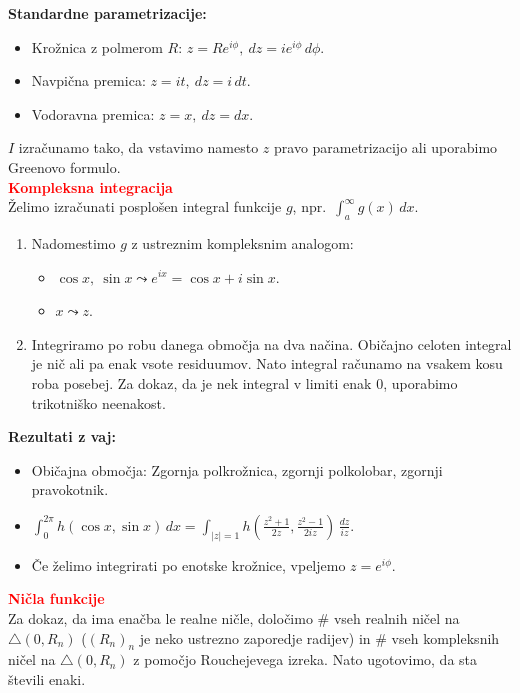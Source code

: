 \documentclass[a4paper,oneside,8pt,landscape]{extarticle}
\begin{document}
\begin{multicols*}{3}
\textbf{Standardne parametrizacije:}
\begin{itemize}
    \item Krožnica z polmerom \(R\): \(z = Re^{i \phi},\ dz = ie^{i\phi}\, d\phi\).
    \item Navpična premica: \(z = it,\ dz = i\, dt\).
    \item Vodoravna premica: \(z = x,\ dz = dx\).
\end{itemize}
\(I\) izračunamo tako, da vstavimo namesto \(z\) pravo parametrizacijo ali uporabimo Greenovo formulo.\\
\textbf{\textcolor{red}{Kompleksna integracija}}\\
Želimo izračunati posplošen integral funkcije \(g\), npr.\ \(\int_{a}^{\infty}g(x)\, dx\).
\begin{enumerate}
    \item Nadomestimo \(g\) z ustreznim kompleksnim analogom:
    \begin{itemize}
        \item \(\cos x, \ \sin x \leadsto e^{ix} = \cos x + i \sin x\).
        \item \(x \leadsto z\).
    \end{itemize}
    \item Integriramo po robu danega območja na dva načina. Običajno celoten integral je nič ali pa enak vsote residuumov. Nato integral računamo na vsakem kosu roba posebej. Za dokaz, da je nek integral v limiti enak \(0\), uporabimo trikotniško neenakost.
\end{enumerate}
\textbf{Rezultati z vaj:}
\begin{itemize}
    \item Običajna območja: Zgornja polkrožnica, zgornji polkolobar, zgornji pravokotnik.
    \item \(\int_{0}^{2\pi} h(\cos x, \sin x)\, dx = \int_{|z| = 1} h(\frac{z^2+1}{2z}, \frac{z^2-1}{2iz})\, \frac{dz}{iz}\).
    \item Če želimo integrirati po enotske krožnice, vpeljemo \(z = e^{i\phi}\).
\end{itemize}
%
%
\textbf{\textcolor{red}{Ničla funkcije}}\\
Za dokaz, da ima enačba le realne ničle, določimo \# vseh realnih ničel na \(\triangle(0, R_n)\) (\((R_n)_n\) je neko ustrezno zaporedje radijev) in \# vseh kompleksnih ničel na \(\triangle(0, R_n)\) z pomočjo Rouchejevega izreka. Nato ugotovimo, da sta števili enaki.\\

\end{multicols*}
\end{document}
